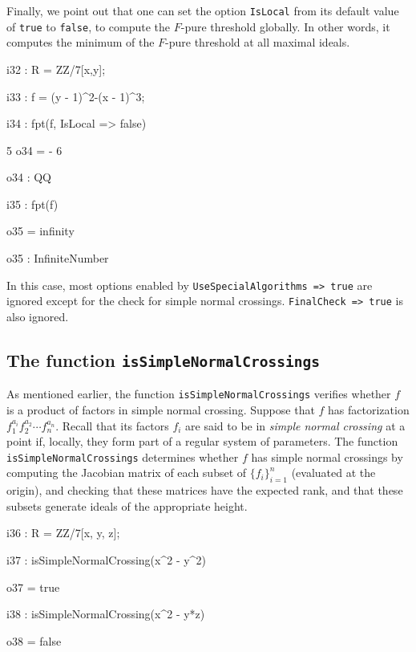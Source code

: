 \documentclass{amsart}
\begin{document}
Finally, we point out that one can set the option \texttt{IsLocal} from its default value of \texttt{true} to \texttt{false}, to compute the $F$-pure threshold globally. In other words, it computes the minimum of the $F$-pure threshold at all maximal ideals.

\bigskip
{\small
{}
\begin{MyVerbatim}
i32 : R = ZZ/7[x,y];

i33 : f = (y - 1)^2-(x - 1)^3;

i34 : fpt(f, IsLocal => false)

      5
o34 = -
      6

o34 : QQ

i35 : fpt(f)

o35 = infinity

o35 : InfiniteNumber
\end{MyVerbatim}
}
\bigskip

\noindent In this case, most options enabled by \texttt{UseSpecialAlgorithms => true}
are ignored except for the check for simple normal crossings.  \texttt{FinalCheck => true}
is also ignored.

\subsection{The function \texttt{isSimpleNormalCrossings}} \label{subsec.SNC}
As mentioned earlier, the function \texttt{isSimpleNormalCrossings} verifies whether $f$ is a product of factors in simple normal crossing.
Suppose that $f$ has factorization $f_1^{a_i} f_2^{a_2} \cdots f_n^{a_n}$.  Recall that its factors $f_i$ are said to be in
\emph{simple normal crossing} at a point if, locally, they form part of a regular system of parameters.  The function \texttt{isSimpleNormalCrossings} determines whether $f$ has simple normal crossings by computing the Jacobian matrix of each subset of $\{ f_i \}_{i=1}^n$ (evaluated at the origin), and checking that these matrices have the expected rank, and that these subsets generate ideals of the appropriate height.

\bigskip
{\small
{}
\begin{MyVerbatim}
i36 : R = ZZ/7[x, y, z];

i37 : isSimpleNormalCrossing(x^2 - y^2)

o37 = true

i38 : isSimpleNormalCrossing(x^2 - y*z)

o38 = false
\end{MyVerbatim}
}
\bigskip
\end{document}

